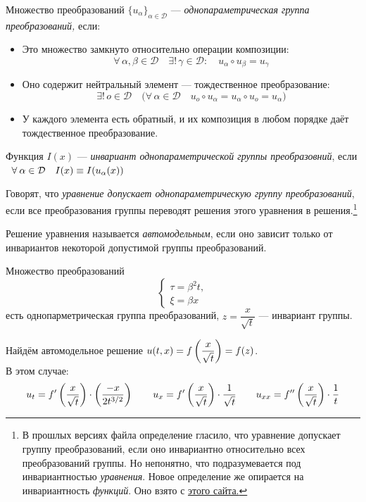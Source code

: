 \documentclass[../main.tex]{subfiles}
\begin{document}
\begin{definition} 
Множество преобразований $\{u_{\alpha}\}_{\alpha \in \mathcal{D}}$ --- \emph{однопараметрическая группа преобразований,} если:
\begin{itemize}
	\item Это множество замкнуто относительно операции композиции:
	$$\forall\, \alpha, \beta \in \mathcal{D} \quad \exists!\,\gamma \in \mathcal{D}\colon \quad u_\alpha \circ u_\beta = u_\gamma$$
	
	\item Оно содержит нейтральный элемент --- тождественное преобразование:
	$$\exists!\, o \in \mathcal{D} \quad \bigl(\forall\, \alpha \in \mathcal{D} \quad u_o \circ u_\alpha = u_\alpha \circ u_o = u_\alpha \bigr)$$
	
	\item У каждого элемента есть обратный, и их композиция в любом порядке даёт тождественное преобразование.
\end{itemize}
\end{definition}
	
\begin{definition}
	Функция $I(x)$ --- \textit{инвариант однопараметрической группы преобразовний}, если $\;\;\forall\: \alpha \in \mathcal{D} \quad I(x) \equiv I(u_{\alpha}(x))$
	\end{definition}
	\begin{definition}
	Говорят, что \textit{уравнение допускает однопараметрическую группу преобразований}, если все преобразования группы переводят решения этого уравнения в решения.\footnote{В прошлых версиях файла определение гласило, что уравнение допускает группу преобразований, если оно инвариантно относительно всех преобразований группы. Но непонятно, что подразумевается под инвариантностью \emph{уравнения}. Новое определение же опирается на инвариантность \emph{функций}. Оно взято с \href{https://matem.anrb.ru/bsuconf/2012/adlerv7.pdf}{этого сайта.}}
\end{definition}

\begin{definition}
Решение уравнения называется \textit{автомодельным}, если оно зависит только от инвариантов некоторой допустимой группы преобразований.
\end{definition}
\begin{example}
Множество преобразований
\begin{equation*}
\begin{cases}
	\tau = \beta^2 t, \\
	\xi = \beta x
\end{cases}
\end{equation*}
есть однопарметрическая группа преобразований, $z = \dfrac{x}{\sqrt{t}} $ --- инвариант группы.
\end{example}
Найдём автомодельное решение $u(t, x) = f\left(\dfrac{x}{\sqrt{t}}\right) = f(z)$. \\
В этом случае:
\begin{equation*}
	u_t = f'\left(\dfrac{x}{\sqrt{t}}\right) \cdot \left(\frac{-x}{2t^{3/2}}\right) 
	\qquad u_x = f'\left(\frac{x}{\sqrt{t}}\right) \cdot \frac{1}{\sqrt{t}} 
	\qquad u_{xx} = f''\left(\frac{x}{\sqrt{t}}\right) \cdot \frac{1}{t}
\end{equation*}
\end{document}

